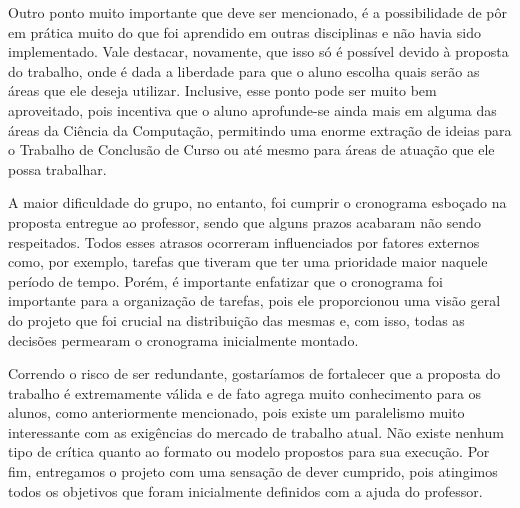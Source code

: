 Outro ponto muito importante que deve ser mencionado, é a possibilidade de pôr em prática muito do que foi aprendido em outras disciplinas e não havia sido implementado. Vale destacar, novamente, que isso só é possível devido à proposta do trabalho, onde é dada a liberdade para que o aluno escolha quais serão as áreas que ele deseja utilizar. Inclusive, esse ponto pode ser muito bem aproveitado, pois incentiva que o aluno aprofunde-se ainda mais em alguma das áreas da Ciência da Computação, permitindo uma enorme extração de ideias para o Trabalho de Conclusão de Curso ou até mesmo para áreas de atuação que ele possa trabalhar.

A maior dificuldade do grupo, no entanto, foi cumprir o cronograma esboçado na proposta entregue ao professor, sendo que alguns prazos acabaram não sendo respeitados. Todos esses atrasos ocorreram influenciados por fatores externos como, por exemplo, tarefas que tiveram que ter uma prioridade maior naquele período de tempo. Porém, é importante enfatizar que o cronograma foi importante para a organização de tarefas, pois ele proporcionou uma visão geral do projeto que foi crucial na distribuição das mesmas e, com isso, todas as decisões permearam o cronograma inicialmente montado.

Correndo o risco de ser redundante, gostaríamos de fortalecer que a proposta do trabalho é extremamente válida e de fato agrega muito conhecimento para os alunos, como anteriormente mencionado, pois existe um paralelismo muito interessante com as exigências do mercado de trabalho atual. Não existe nenhum tipo de crítica quanto ao formato ou modelo propostos para sua execução. Por fim, entregamos o projeto com uma sensação de dever cumprido, pois atingimos todos os objetivos que foram inicialmente definidos com a ajuda do professor.